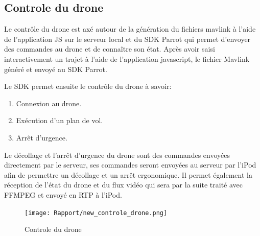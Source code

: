 \documentclass{article}
\begin{document}
\newpage
        
	 \subsection{Controle du drone}
	 Le contrôle du drone est axé autour de la génération du fichiers mavlink à l'aide de l'application JS sur le serveur local et du SDK Parrot qui permet d'envoyer des commandes au drone et de connaître son état.
	 \newline
	 Après avoir saisi interactivement un trajet à l'aide de l'application javascript, le fichier Mavlink généré et envoyé au SDK Parrot. 
	 \vspace{0.1cm}
	 \newline
	 
	 Le SDK permet ensuite le contrôle du drone à savoir:
	 \begin{enumerate}
        	\item Connexion au drone.
        	\item Exécution d'un plan de vol.
			\item Arrêt d'urgence.
    \end{enumerate}
    Le décollage et l'arrêt d'urgence du drone sont des commandes envoyées directement par le serveur, ses commandes seront envoyées au serveur par l'iPod afin de permettre un décollage et un arrêt ergonomique.
    \vspace{0.2cm}
    \newline
    Il permet également la réception de l'état du drone et du flux vidéo qui sera par la suite traité avec FFMPEG et envoyé en RTP à l'iPod.
    
	    \vspace*{0.3cm}
	    \begin{center}
		\begin{figure}[!h]
		\texttt{[image: Rapport/new\_controle\_drone.png]}\\
		\caption{Controle du drone}
		\end{figure}
        \end{center}
		
     \newpage
\end{document}
